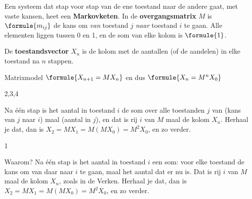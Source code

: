 
\begin{theorie}
Een systeem dat stap voor stap van de ene toestand naar de andere gaat, met vaste kansen, heet een \textbf{\textcolor{accent}{Markovketen}}. In de \textbf{\textcolor{accent}{overgangsmatrix}} $M$ is $\formule{m_{ij}}$ de kans om \emph{van} toestand $j$ \emph{naar} toestand $i$ te gaan. Alle elementen liggen tussen 0 en 1, en de som van elke kolom is $\formule{1}$.

\vspace{1mm}
De \textbf{\textcolor{accent}{toestandsvector}} $X_n$ is de kolom met de aantallen (of de aandelen) in elke toestand na $n$ stappen.

\begin{stelling}{Matrixmodel}
\qquad $\formule{X_{n+1} = M X_n}$ \qquad en dus \qquad $\formule{X_n = M^n X_0}$
\end{stelling}
\begin{alleenvoor}{2,3,4}

\begin{bewijs}
Na één stap is het aantal in toestand $i$ de som over alle toestanden $j$ van (kans van $j$ naar $i$) maal (aantal in $j$), en dat is rij $i$ van $M$ maal de kolom $X_n$. Herhaal je dat, dan is $X_2 = M X_1 = M (M X_0) = M^2 X_0$, en zo verder.
\end{bewijs}
\end{alleenvoor}
\end{theorie}
\begin{alleenvoor}{1}

Waarom? Na één stap is het aantal in toestand $i$ een som: voor elke toestand de kans om van daar naar $i$ te gaan, maal het aantal dat er nu is. Dat is rij $i$ van $M$ maal de kolom $X_n$, zoals in de Verken. Herhaal je dat, dan is $X_2 = M X_1 = M (M X_0) = M^2 X_0$, en zo verder.
\end{alleenvoor}


